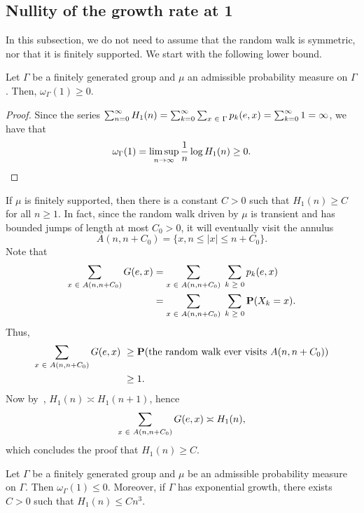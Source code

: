 \documentclass[AHL,Unicode,longabstracts]{cedram}
\newcommand{\bfP}{\mathbf{P}}
\let\oldin\in
\renewcommand{\in}{\mathchoice{\oldin}{\oldin}{\,\oldin\,}{\,\oldin\,}}
\let\oldge\ge
\renewcommand{\ge}{\mathchoice{\oldge}{\oldge}{\,\oldge\,}{\,\oldge\,}}
\renewcommand*{\to}{\mathchoice{\longrightarrow}{\rightarrow}{\rightarrow}{\rightarrow}}
\newcommand*{\MK}{\mkern 2mu}
\begin{document}
\subsection{Nullity of the growth rate at 1}

In this subsection, we do not need to assume that the random walk is symmetric, nor that it is finitely supported. We start with the following lower bound.

\begin{lemm}\label{lowerboundgrowthrateat1}
Let $\Gamma$ be a finitely generated group and $\mu$ an admissible probability measure on $\Gamma$. Then, $\omega_\Gamma(1)\geq 0$.
\end{lemm}

\begin{proof}
Since the series $\sum_{n = 0}^{\infty} H_1(n) = \sum_{k=0}^{\infty} \sum_{x \in \Gamma} p_k(e, x) = \sum_{k=0}^{\infty} 1 = \infty$, we have that
\begin{equation*}
\omega_{\Gamma}(1) = \limsup_{n \to \infty} \frac{1}{n} \log H_1(n) \geq 0. \qedhere
\end{equation*}
\end{proof}


\begin{rema}
If $\mu$ is finitely supported, then there is a constant $C > 0$ such that $H_1(n) \geq C$ for all $n \geq 1$. In fact, since the random walk driven by {$\mu$ is transient} and has bounded jumps of length at most $C_0>0$, it will eventually visit the annulus
\[
A(n,n+C_0)=\{x,n\leq |x|\leq n+C_0\}.
\]
Note that
\begin{align*}
\sum_{x\in A(n,n+C_0)}G(e,x) &= \sum_{x\in A(n,n+C_0)}\;\sum_{k\ge 0}p_k(e,x)\\
&=\sum_{x\in A(n,n+C_0)}\;\sum_{k\ge 0}\bfP(X_k=x).
\end{align*}
Thus,
\begin{align*}
\sum_{x\in A(n,n+C_0)}G(e,x) & \ \geq \bfP(\text{the random walk ever visits }A(n,n+C_0)) \\
&\ \geq 1.
\end{align*}
Now by~\cite[Lemma~3.1$\MK$(1)]{DWY}, $H_1(n)\asymp H_1(n+1)$, hence
\[
\sum_{x\in A(n,n+C_0)}G(e,x)\asymp H_1(n),
\]
which concludes the proof that $H_1(n) \geq C$.
\end{rema}


\begin{prop}\label{upperboundgrowthrateat1}
Let $\Gamma$ be a finitely generated group and $\mu$ be an admissible probability measure on $\Gamma$. Then $\omega_{\Gamma}(1) \leq 0$. Moreover, if $\Gamma$ has exponential growth, there exists $C>0$ such that $H_1(n)\leq C n^{3}$.
\end{prop}
\end{document}
